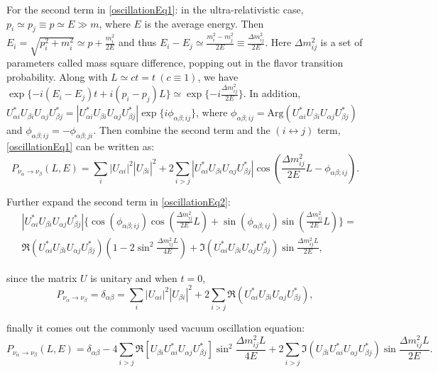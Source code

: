 For the second term in \ref{oscillationEq1}: in the ultra-relativistic case, $p_i\simeq p_j\equiv p\simeq E\gg m$, where $E$ is the average energy. Then $E_i=\sqrt{p^2_i+m^2_i}\simeq p+\frac{m_i^2}{2E}$ and thus $E_i-E_j\simeq \frac{m^2_i-m^2_j}{2E}\equiv \frac{\Delta m^2_{ij}}{2E}$\cite{pdg2018,aitchison2012gauge}. Here $\Delta m^2_{ij}$ is a set of parameters called mass square difference, popping out in the flavor transition probability. Along with $L\simeq ct=t~(c\equiv 1)$, we have $\exp\{-i(E_i-E_j)t+i(p_i-p_j)L\}\simeq \exp\{-i\frac{\Delta m^2_{ij}}{2E}\}$. In addition, $U^*_{\alpha i}U_{\beta i}U_{\alpha j}U^*_{\beta j}=|U^*_{\alpha i}U_{\beta i}U_{\alpha j}U^*_{\beta j}|\exp\{i\phi_{\alpha\beta;ij}\}$, where $\phi_{\alpha\beta;ij}=\mathrm{Arg}(U^*_{\alpha i}U_{\beta i}U_{\alpha j}U^*_{\beta j})$ and $\phi_{\alpha\beta;ij}=-\phi_{\alpha\beta;ji}$. Then combine the second term and the $(i\leftrightarrow j)$ term, \ref{oscillationEq1} can be written as\cite{aitchison2012gauge}:
\begin{equation}\label{oscillationEq2}
P_{\nu_\alpha\to\nu_\beta}(L,E)=
\sum_i |U_{\alpha i}|^2|U_{\beta i}|^2 + 2\sum_{i>j}|U^*_{\alpha i}U_{\beta i}U_{\alpha j}U^*_{\beta j}|\cos(\frac{\Delta m^2_{ij}}{2E}L-\phi_{\alpha\beta;ij}).
\end{equation}

Further expand the second term in \ref{oscillationEq2}:
\begin{equation}
 \begin{split}
&|U^*_{\alpha i}U_{\beta i}U_{\alpha j}U^*_{\beta j}|\{\cos(\phi_{\alpha\beta;ij})\cos(\frac{\Delta m^2_{ij}}{2E}L)+\sin(\phi_{\alpha\beta;ij})\sin(\frac{\Delta m^2_{ij}}{2E}L)\}=\\
&\Re(U^*_{\alpha i}U_{\beta i}U_{\alpha j}U^*_{\beta j})(1-2\sin^2\frac{\Delta m^2_{ij}L}{4E})+\Im(U^*_{\alpha i}U_{\beta i}U_{\alpha j}U^*_{\beta j})\sin\frac{\Delta m^2_{ij}L}{2E},
 \end{split}
\end{equation}

since the matrix $U$ is unitary and when $t=0$, 
\begin{equation}
P_{\nu_\alpha\to\nu_\beta}=\delta_{\alpha\beta}=\sum_i |U_{\alpha i}|^2|U_{\beta i}|^2+2\sum_{i>j}\Re(U^*_{\alpha i}U_{\beta i}U_{\alpha j}U^*_{\beta j}),
\end{equation} 

finally it comes out the commonly used vacuum oscillation equation\cite{pdg2018,aitchison2012gauge}:
\begin{equation}\label{common_oscillation}
P_{\nu_\alpha\to\nu_\beta}(L,E)=\delta_{\alpha\beta}-4\sum_{i>j} \Re[U_{\beta i}U^*_{\alpha i}U_{\alpha j}U^*_{\beta j}]\sin^2\frac{\Delta m^2_{ij}L}{4E}+2\sum_{i>j} \Im(U_{\beta i}U^*_{\alpha i}U_{\alpha j}U^*_{\beta j})\sin\frac{\Delta m^2_{ij}L}{2E}.
\end{equation}

